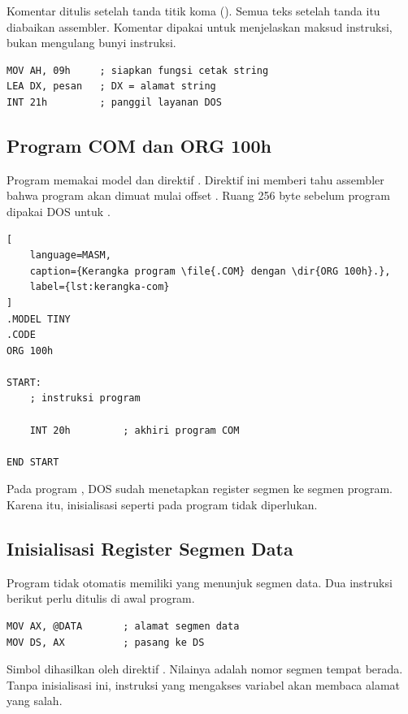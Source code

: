 Komentar ditulis setelah tanda titik koma (\code{;}). Semua teks
setelah tanda itu diabaikan assembler. Komentar dipakai untuk
menjelaskan maksud instruksi, bukan mengulang bunyi instruksi.

\begin{lstlisting}[language=MASM, numbers=none]
MOV AH, 09h     ; siapkan fungsi cetak string
LEA DX, pesan   ; DX = alamat string
INT 21h         ; panggil layanan DOS
\end{lstlisting}

\subsection{Program COM dan ORG 100h}

Program  memakai model  dan direktif
. Direktif ini memberi tahu assembler bahwa program
akan dimuat mulai offset . Ruang 256 byte sebelum program
dipakai DOS untuk .

\begin{lstlisting}[
    language=MASM,
    caption={Kerangka program \file{.COM} dengan \dir{ORG 100h}.},
    label={lst:kerangka-com}
]
.MODEL TINY
.CODE
ORG 100h

START:
    ; instruksi program

    INT 20h         ; akhiri program COM

END START
\end{lstlisting}

Pada program , DOS sudah menetapkan register segmen ke
segmen program. Karena itu, inisialisasi  seperti pada
program  tidak diperlukan.

\subsection{Inisialisasi Register Segmen Data}

Program  tidak otomatis memiliki  yang menunjuk
segmen data. Dua instruksi berikut perlu ditulis di awal program.

\begin{lstlisting}[language=MASM, numbers=none]
MOV AX, @DATA       ; alamat segmen data
MOV DS, AX          ; pasang ke DS
\end{lstlisting}

Simbol  dihasilkan oleh direktif . Nilainya
adalah nomor segmen tempat  berada. Tanpa inisialisasi
ini, instruksi yang mengakses variabel akan membaca alamat yang
salah.

